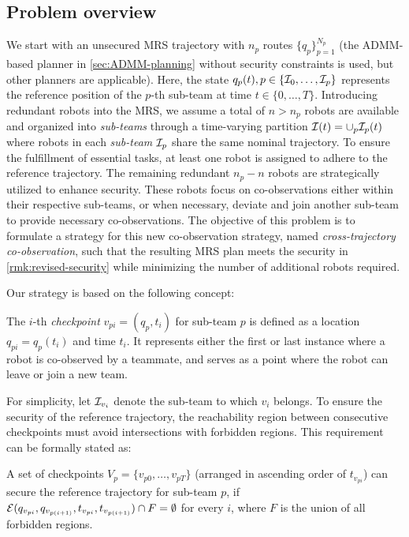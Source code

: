 \documentclass[10pt,twocolumn,twoside]{IEEEtran}
\begin{document}
\subsection{Problem overview}
We start with an unsecured MRS trajectory with $n_p$ routes $\{q_p\}_{p=1}^{N_p}$ (the ADMM-based planner in \cref{sec:ADMM-planning} without security constraints is used, but other planners are applicable). Here, the state $q_p(t), p \in\{\mathcal{I}_0,\ldots,\mathcal{I}_{p}\}$ represents the reference position of the $p$-th sub-team at time $t\in\{0, \dots, T\}$. Introducing redundant robots into the MRS, we assume a total of $n > n_p$ robots are available and organized into \emph{sub-teams} through a time-varying partition $\mathcal{I}(t)=\cup_p \mathcal{I}_p(t)$ where robots in each \emph{sub-team} $\mathcal{I}_p$ share the same nominal trajectory. To ensure the fulfillment of essential tasks, at least one robot is assigned to adhere to the reference trajectory. The remaining redundant $n_p-n$ robots are strategically utilized to enhance security. These robots focus on co-observations either within their respective sub-teams, or when necessary, deviate and join another sub-team to provide necessary co-observations. The objective of this problem is to formulate a strategy for this new co-observation strategy, named \emph{cross-trajectory co-observation}, such that the resulting MRS plan meets the security in \cref{rmk:revised-security} while minimizing the number of additional robots required. 

Our strategy is based on the following concept:
\begin{definition}
The $i$-th \emph{checkpoint} $v_{pi}=(q_{p},t_{i})$ for sub-team $p$ is defined as a location $q_{pi}=q_{p}(t_i)$ and time $t_{i}$. It represents either the first or last instance where a robot is co-observed by a teammate, and serves as a point where the robot can leave or join a new team.
\end{definition}
For simplicity, let $\mathcal{I}_{v_{i}}$ denote the sub-team to which $v_{i}$ belongs. 
To ensure the security of the reference trajectory, the reachability region between consecutive checkpoints must avoid intersections with forbidden regions. This requirement can be formally stated as:
\begin{remark}\label{rmk:checkpoints}
  A set of checkpoints $V_{p}=\{ v_{p0}, \dots ,v_{pT}\}$ (arranged in ascending order of $t_{v_{pi}}$) can secure the reference trajectory for sub-team $p$, if $\mathcal{E}(q_{v_{pi}}, q_{v_{p(i+1)}}, t_{v_{pi}},t_{v_{p(i+1)}}) \cap F = \emptyset$ for every $i$, where $F$ is the union of all forbidden regions.
  \end{remark}
\end{document}
